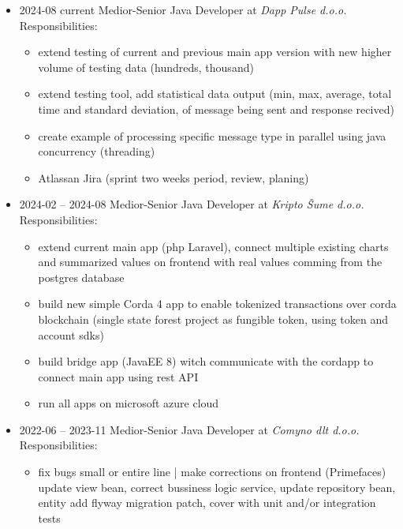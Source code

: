 \documentclass[12pt]{article}
\begin{document}
\begin{itemize}
    \setlength\itemsep{0em}
    \item 2024-08 current Medior-Senior Java Developer at \textit{Dapp Pulse d.o.o.} \\
          Responsibilities:
          \begin{itemize}
            \setlength\itemsep{0em}
            \item extend testing of current and previous main app version with new higher volume of testing data (hundreds, thousand)
            \item extend testing tool, add statistical data output (min, max, average, total time and standard deviation, of message being sent and response recived)
            \item create example of processing specific message type in parallel using java concurrency (threading)
            \item Atlassan Jira (sprint two weeks period, review, planing)
          \end{itemize}
    \item 2024-02 -- 2024-08 Medior-Senior Java Developer at \textit{Kripto Šume d.o.o.} \\
          Responsibilities:
          \begin{itemize}
            \setlength\itemsep{0em}
            \item extend current main app (php Laravel), connect multiple existing charts and summarized values on frontend with real values comming from the postgres database
            \item build new simple Corda 4 app to enable tokenized transactions over corda blockchain (single state forest project as fungible token, using token and account sdks)
            \item build bridge app (JavaEE 8) witch communicate with the cordapp to connect main app using rest API
            \item run all apps on microsoft azure cloud
          \end{itemize}
    \item 2022-06 -- 2023-11 Medior-Senior Java Developer at \textit{Comyno dlt d.o.o.} \\
          Responsibilities:
          \begin{itemize}
            \setlength\itemsep{0em}
            \item fix bugs small or entire line | make corrections on frontend (Primefaces) update view bean, correct bussiness logic service, update repository bean, entity add flyway migration patch, cover with unit and/or integration tests 

\end{itemize}
\end{itemize}
\end{document}
